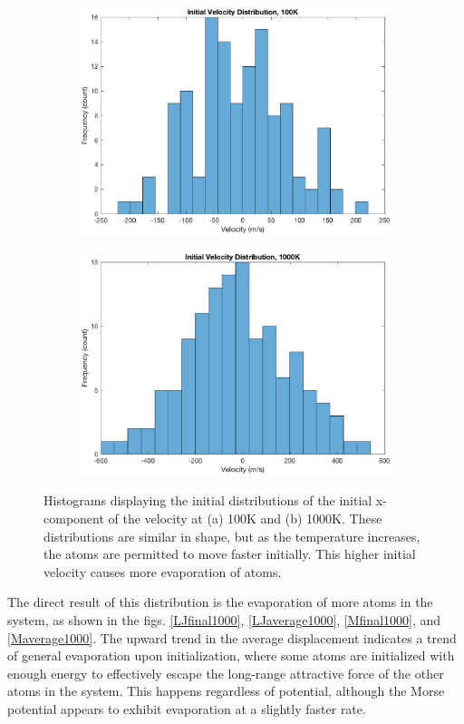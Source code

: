 \documentclass[12pt]{article}
\begin{document}
\begin{figure}[!h]
\begin{subfigure}{0.5\textwidth}
\includegraphics[width=\linewidth]{./finalpics/100initialvelocity.eps}
\caption{\label{maxwell100}}
\end{subfigure}
\begin{subfigure}{0.5\textwidth}
\includegraphics[width=\linewidth]{./finalpics/1000initialvelocity.eps}
\caption{\label{maxwell1000}}
\end{subfigure}
\caption{Histograms displaying the initial distributions of the initial x-component of the velocity at (a) 100K and (b) 1000K.  These distributions are similar in shape, but as the temperature increases, the atoms are permitted to move faster initially.  This higher initial velocity causes more evaporation of atoms.} 
\end{figure}
The direct result of this distribution is the evaporation of more atoms in the system, as shown in the figs. \ref{LJfinal1000}, \ref{LJaverage1000}, \ref{Mfinal1000}, and \ref{Maverage1000}.  The upward trend in the average displacement indicates a trend of general evaporation upon initialization, where some atoms are initialized with enough energy to effectively escape the long-range attractive force of the other atoms in the system.  This happens regardless of potential, although the Morse potential appears to exhibit evaporation at a slightly faster rate.
\end{document}
